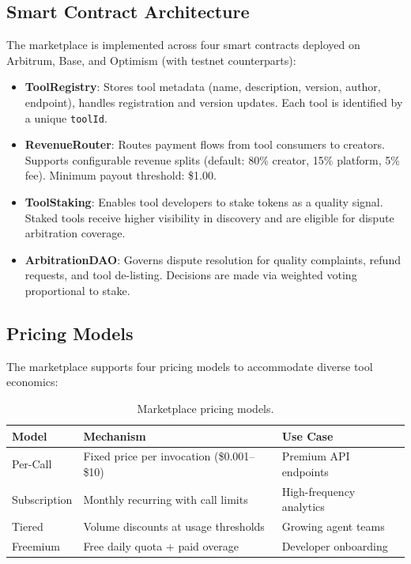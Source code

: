 \documentclass[11pt]{article}
\begin{document}
\subsection{Smart Contract Architecture}

The marketplace is implemented across four smart contracts deployed on Arbitrum, Base, and Optimism (with testnet counterparts):

\begin{itemize}[leftmargin=*]
  \item \textbf{ToolRegistry}: Stores tool metadata (name, description, version, author, endpoint), handles registration and version updates. Each tool is identified by a unique \texttt{toolId}.
  \item \textbf{RevenueRouter}: Routes payment flows from tool consumers to creators. Supports configurable revenue splits (default: 80\% creator, 15\% platform, 5\% fee). Minimum payout threshold: \$1.00.
  \item \textbf{ToolStaking}: Enables tool developers to stake tokens as a quality signal. Staked tools receive higher visibility in discovery and are eligible for dispute arbitration coverage.
  \item \textbf{ArbitrationDAO}: Governs dispute resolution for quality complaints, refund requests, and tool de-listing. Decisions are made via weighted voting proportional to stake.
\end{itemize}

\subsection{Pricing Models}

The marketplace supports four pricing models to accommodate diverse tool economics:

\begin{table}[h]
\centering
\caption{Marketplace pricing models.}
\label{tab:pricing}
\begin{tabular}{@{}lll@{}}
\toprule
\textbf{Model} & \textbf{Mechanism} & \textbf{Use Case} \\
\midrule
Per-Call    & Fixed price per invocation (\$0.001--\$10)   & Premium API endpoints \\
Subscription & Monthly recurring with call limits          & High-frequency analytics \\
Tiered      & Volume discounts at usage thresholds         & Growing agent teams \\
Freemium    & Free daily quota + paid overage              & Developer onboarding \\
\bottomrule
\end{tabular}
\end{table}
\end{document}
